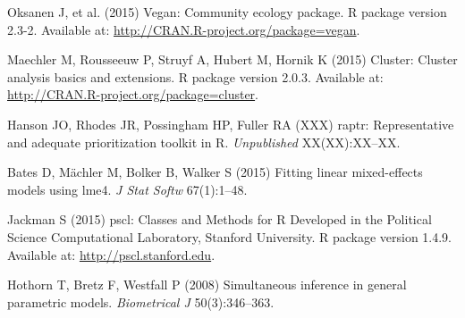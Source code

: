 \documentclass[9pt,twocolumn,twoside,lineno]{pnas-new}
\begin{document}
\begin{thebibliography}{100}
Oksanen J, et al. (2015) Vegan: Community ecology package. R package
version 2.3-2. Available at:
\url{http://CRAN.R-project.org/package=vegan}.

Maechler M, Rousseeuw P, Struyf A, Hubert M, Hornik K (2015)
Cluster: Cluster analysis basics and extensions. R package version
2.0.3. Available at: \url{http://CRAN.R-project.org/package=cluster}.

Hanson JO, Rhodes JR, Possingham HP, Fuller RA (XXX) raptr:
Representative and adequate prioritization toolkit in R.
\emph{Unpublished} XX(XX):XX--XX.

Bates D, Mächler M, Bolker B, Walker S (2015) Fitting linear
mixed-effects models using lme4. \emph{J Stat Softw} 67(1):1--48.

Jackman S (2015) pscl: Classes and Methods for R Developed in the
Political Science Computational Laboratory, Stanford University. R
package version 1.4.9. Available at: \url{http://pscl.stanford.edu}.

Hothorn T, Bretz F, Westfall P (2008) Simultaneous inference in
general parametric models. \emph{Biometrical J} 50(3):346--363.



% 

\end{thebibliography}
\end{document}
